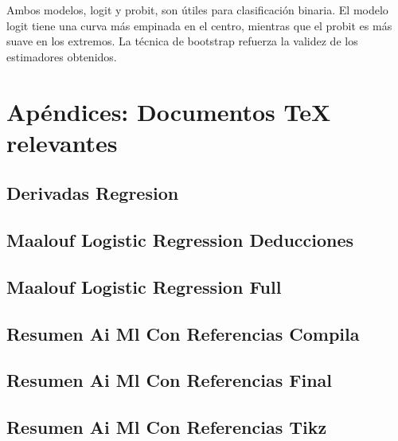 \documentclass[
]{article}
\begin{document}
Ambos modelos, logit y probit, son útiles para clasificación binaria. El
modelo logit tiene una curva más empinada en el centro, mientras que el
probit es más suave en los extremos. La técnica de bootstrap refuerza la
validez de los estimadores obtenidos.

\section{Apéndices: Documentos TeX
relevantes}\label{apuxe9ndices-documentos-tex-relevantes}

\subsection{Derivadas Regresion}\label{derivadas-regresion}



\subsection{Maalouf Logistic Regression
Deducciones}\label{maalouf-logistic-regression-deducciones}



\subsection{Maalouf Logistic Regression
Full}\label{maalouf-logistic-regression-full}



\subsection{Resumen Ai Ml Con Referencias
Compila}\label{resumen-ai-ml-con-referencias-compila}



\subsection{Resumen Ai Ml Con Referencias
Final}\label{resumen-ai-ml-con-referencias-final}



\subsection{Resumen Ai Ml Con Referencias
Tikz}\label{resumen-ai-ml-con-referencias-tikz}
\end{document}
